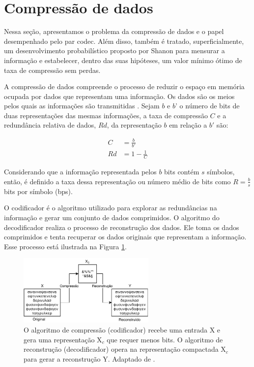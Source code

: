 \section{Compressão de dados}
Nessa seção, apresentamos o problema da compressão de dados e o papel desempenhado pelo par \gls{codec}. Além disso, também é tratado, superficialmente, um desenvolvimento probabilístico proposto por Shanon para mensurar a informação e estabelecer, dentro das suas hipóteses, um valor mínimo ótimo de taxa de compressão sem perdas.

A compressão de dados compreende o processo de reduzir o espaço em memória ocupada por dados que representam uma informação. Os dados são os meios pelos quais as informações são transmitidas \cite{gonzalez2009processamento}. Sejam $b$ e $b’$ o número de bits de duas representações das mesmas informações, a taxa de compressão $C$ e a redundância relativa de dados, $Rd$, da representação $b$ em relação a $b'$ são:

\begin{equation}
\label{eq:compressao}
\begin{aligned}
C &= \frac{b}{b'} \\
Rd &= 1 - \frac{1}{C}
\end{aligned}
\end{equation}

Considerando que a informação representada pelos $b$ bits contém $s$ símbolos, então, é definido a taxa dessa representação ou número médio de bits como $R = \frac{b}{s}$ bits por símbolo (bps).   

O codificador é o algoritmo utilizado para explorar as redundâncias na informação e gerar um conjunto de dados comprimidos. O algoritmo do decodificador realiza o processo de reconstrução dos dados. Ele toma os dados comprimidos e tenta recuperar os dados originais que representam a informação. Esse processo está ilustrada na Figura \ref{fig:codec}.


\begin{figure}[h]
	\centering
	\includegraphics[width=0.6\textwidth]{figuras/codec.pdf}
	\caption[Compressão e reconstrução sem perdas.]{O algoritmo de compressão (codificador) recebe uma entrada X e gera uma representação X$_c$ que requer menos bits. O algoritmo de reconstrução (decodificador) opera na representação compactada X$_c$ para gerar a reconstrução Y. Adaptado de \cite{sayood2017introduction}.}
	\label{fig:codec}
\end{figure}


